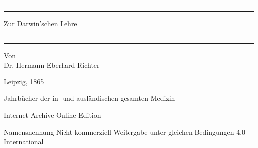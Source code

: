 \documentclass[a4paper, 11pt, oneside, english]{article}
\begin{document}
\begin{titlepage} %
	\centering %
	\scshape %

	
	\rule{\textwidth}{1.6pt}\vspace*{-\baselineskip}\vspace*{2pt} %
	\rule{\textwidth}{0.4pt} %
	
	\vspace{0.75\baselineskip} %

        {\LARGE Zur Darwin'schen Lehre \\} %
	
	\vspace{0.75\baselineskip} %
	
	\rule{\textwidth}{0.4pt}\vspace*{-\baselineskip}\vspace{3.2pt} %
	\rule{\textwidth}{1.6pt} %
	
	\vspace{1\baselineskip} %
	
	
	{Von \\\Large Dr. Hermann Eberhard Richter\\} %
	
	\vspace*{1\baselineskip} %
	
	
		
		
	\vspace*{\fill}%
	

	{Leipzig, 1865} %
 
        {\small Jahrbücher der in- und ausländischen gesamten Medizin}

	\vspace{1\baselineskip} %

    Internet Archive Online Edition  %
	
	{\small Namensnennung Nicht-kommerziell Weitergabe unter gleichen Bedingungen 4.0 International } %
\end{titlepage}
\clearpage
\setlength{\parskip}{1mm plus1mm minus1mm}
\end{document}
